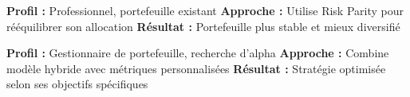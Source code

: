 \documentclass[11pt,a4paper]{article}
\begin{document}
\begin{tcolorbox}[title=Exemple 2 - Investisseur Intermédiaire]
\textbf{Profil :} Professionnel, portefeuille existant
\textbf{Approche :} Utilise Risk Parity pour rééquilibrer son allocation
\textbf{Résultat :} Portefeuille plus stable et mieux diversifié
\end{tcolorbox}

\begin{tcolorbox}[title=Exemple 3 - Investisseur Avancé]
\textbf{Profil :} Gestionnaire de portefeuille, recherche d'alpha
\textbf{Approche :} Combine modèle hybride avec métriques personnalisées
\textbf{Résultat :} Stratégie optimisée selon ses objectifs spécifiques
\end{tcolorbox}
\end{document}
